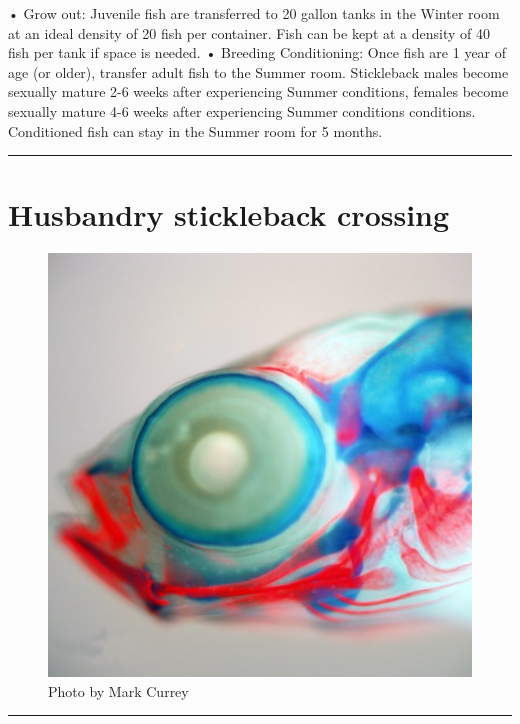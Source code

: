 \documentclass[
]{book}
\begin{document}
• Grow out: Juvenile fish are transferred to 20 gallon tanks in the Winter room at an ideal density of 20 fish per container. Fish can be kept at a density of 40 fish per tank if space is needed.
• Breeding Conditioning: Once fish are 1 year of age (or older), transfer adult fish to the Summer room. Stickleback males become sexually mature 2-6 weeks after experiencing Summer conditions, females become sexually mature 4-6 weeks after experiencing Summer conditions conditions. Conditioned fish can stay in the Summer room for 5 months.

\begin{center}\rule{0.5\linewidth}{0.5pt}\end{center}

\hypertarget{husbandry-stickleback-crossing-1}{%
\chapter{Husbandry stickleback crossing}\label{husbandry-stickleback-crossing-1}}

\begin{figure}
\centering
\includegraphics{images/double_head.jpg}
\caption{Photo by Mark Currey}
\end{figure}

\begin{center}\rule{0.5\linewidth}{0.5pt}\end{center}
\end{document}
